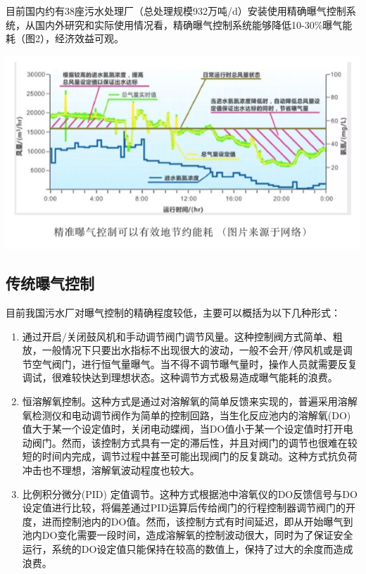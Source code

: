 \documentclass[
]{book}
\begin{document}
目前国内约有38座污水处理厂（总处理规模932万吨/d）安装使用精确曝气控制系统，从国内外研究和实际使用情况看，精确曝气控制系统能够降低10-30\%曝气能耗（图2），经济效益可观。

\includegraphics[width=8.33in]{images/bq2}

\hypertarget{ux4f20ux7edfux66ddux6c14ux63a7ux5236}{%
\subsection{传统曝气控制}\label{ux4f20ux7edfux66ddux6c14ux63a7ux5236}}

目前我国污水厂对曝气控制的精确程度较低，主要可以概括为以下几种形式：

\begin{enumerate}
\def\labelenumi{(\arabic{enumi})}
\item
  通过开启/关闭鼓风机和手动调节阀门调节风量。这种控制阀方式简单、粗放，一般情况下只要出水指标不出现很大的波动，一般不会开/停风机或是调节空气阀门，进行恒气量曝气。当不得不调节曝气量时，操作人员就需要反复调试，很难较快达到理想状态。这种调节方式极易造成曝气能耗的浪费。
\item
  恒溶解氧控制。这种方式是通过对溶解氧的简单反馈来实现的，普遍采用溶解氧检测仪和电动调节阀作为简单的控制回路，当生化反应池内的溶解氧(DO)值大于某一个设定值时，关闭电动蝶阀，当DO值小于某一个设定值时打开电动阀门。然而，该控制方式具有一定的滞后性，并且对阀门的调节也很难在较短的时间内完成，调节过程中甚至可能出现阀门的反复跳动。这种方式抗负荷冲击也不理想，溶解氧波动程度也较大。
\item
  比例积分微分(PID) 定值调节。这种方式根据池中溶氧仪的DO反馈信号与DO设定值进行比较，将偏差通过PID运算后传给阀门的行程控制器调节阀门的开度，进而控制池内的DO值。然而，该控制方式有时间延迟，即从开始曝气到池内DO变化需要一段时间，造成溶解氧的控制波动很大，同时为了保证安全运行，系统的DO设定值只能保持在较高的数值上，保持了过大的余度而造成浪费。
\end{enumerate}
\end{document}
